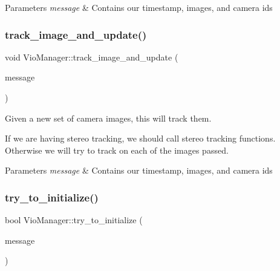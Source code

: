 \begin{DoxyParams}{Parameters}
{\em message} & Contains our timestamp, images, and camera ids \\
\hline
\end{DoxyParams}
\mbox{\label{classov__msckf_1_1VioManager_a626bd0d043f80c4d5e993bcfbbee0244}} 
\subsubsection{\texorpdfstring{track\+\_\+image\+\_\+and\+\_\+update()}{track\_image\_and\_update()}}
{\footnotesize\ttfamily void Vio\+Manager\+::track\+\_\+image\+\_\+and\+\_\+update (\begin{DoxyParamCaption}\item[{const \hyperlink{structov__core_1_1CameraData}{ov\+\_\+core\+::\+Camera\+Data} \&}]{message }\end{DoxyParamCaption})\hspace{0.3cm}{\ttfamily [protected]}}



Given a new set of camera images, this will track them. 

If we are having stereo tracking, we should call stereo tracking functions. Otherwise we will try to track on each of the images passed.


\begin{DoxyParams}{Parameters}
{\em message} & Contains our timestamp, images, and camera ids \\
\hline
\end{DoxyParams}
\mbox{\label{classov__msckf_1_1VioManager_adc329d2be4fad2addd93e01e5318c102}} 
\subsubsection{\texorpdfstring{try\+\_\+to\+\_\+initialize()}{try\_to\_initialize()}}
{\footnotesize\ttfamily bool Vio\+Manager\+::try\+\_\+to\+\_\+initialize (\begin{DoxyParamCaption}\item[{const \hyperlink{structov__core_1_1CameraData}{ov\+\_\+core\+::\+Camera\+Data} \&}]{message }\end{DoxyParamCaption})\hspace{0.3cm}{\ttfamily [protected]}}



